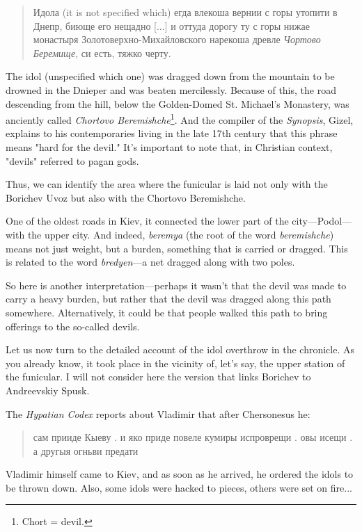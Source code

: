 \documentclass[a5paper,11pt,openany]{article}
\begin{document}
\begin{quotation}
\noindent Идола (it is not specified which) егда влекоша вернии с горы утопити в Днепр, биюще его нещадно [...] и оттуда дорогу ту с горы нижае
монастыря Золотоверхно-Михайловского нарекоша древле \textit{Чортово Беремище}, си есть, тяжко черту.
\end{quotation}

The idol (unspecified which one) was dragged down from the mountain to be drowned in the Dnieper and was beaten mercilessly. Because of this, the road descending from the hill, below the Golden-Domed St. Michael’s Monastery, was anciently called \textit{Chortovo Beremishche}\footnote{Chort = devil.}. And the compiler of the \textit{Synopsis}, Gizel, explains to his contemporaries living in the late 17th century that this phrase means "hard for the devil." It’s important to note that, in Christian context, "devils" referred to pagan gods.

Thus, we can identify the area where the funicular is laid not only with the Borichev Uvoz but also with the Chortovo Beremishche.

One of the oldest roads in Kiev, it connected the lower part of the city—Podol—with the upper city. And indeed, \textit{beremya} (the root of the word \textit{beremishche}) means not just weight, but a burden, something that is carried or dragged. This is related to the word \textit{bredyen}—a net dragged along with two poles.

So here is another interpretation—perhaps it wasn’t that the devil was made to carry a heavy burden, but rather that the devil was dragged along this path somewhere. Alternatively, it could be that people walked this path to bring offerings to the so-called devils.

Let us now turn to the detailed account of the idol 
overthrow in the chronicle. As you already know, it took place in the vicinity of, let’s say, the upper station of the funicular. I will not consider here the version that links Borichev to Andreevskiy Spusk.

The \textit{Hypatian Codex} reports about Vladimir that after Chersonesus he:

\begin{quotation}
\noindent сам прииде Кыеву . и яко приде
повеле кумиры испроврещи . овы исещи . а другыя огньви предати
\end{quotation}

Vladimir himself came to Kiev, and as soon as he arrived, he ordered the idols to be thrown down. Also, some idols were hacked to pieces, others were set on fire...
\end{document}
